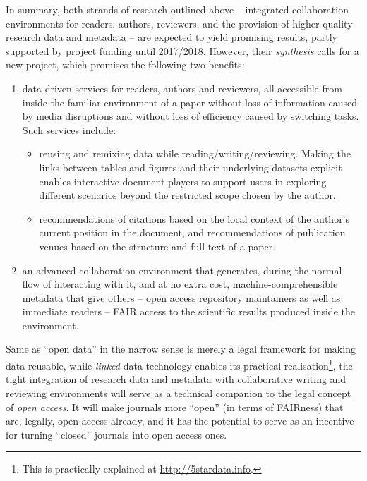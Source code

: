 \documentclass[a4paper,UKenglish]{dagrep}
\begin{document}
In summary, both strands of research outlined above – integrated collaboration
environments for readers, authors, reviewers, and the provision of
higher-quality research data and metadata – are expected to yield promising
results, partly supported by project funding until 2017/2018.
However, their \emph{synthesis} calls for a new project, which promises the
following two benefits:
\begin{enumerate}
\item data-driven services for readers, authors and reviewers, all accessible
from inside the familiar environment of a paper without loss of information
caused by media disruptions and without loss of efficiency caused by switching
tasks.
  Such services include:
  \begin{itemize}
  \item reusing and remixing data while reading/writing/reviewing.
    Making the links between tables and figures and their underlying datasets
explicit enables interactive document players to support users in exploring
different scenarios beyond the restricted scope chosen by the author.
  \item recommendations of citations based on the local context of the author's
current position in the document, and recommendations of publication venues
based on the structure and full text of a paper.
  \end{itemize}
\item an advanced collaboration environment that generates, during the normal
flow of interacting with it, and at no extra cost, machine-comprehensible
metadata that give others
– open access repository maintainers as well as immediate readers – FAIR access
to the scientific results produced inside the environment.
\end{enumerate}

Same as ``open data'' in the narrow sense is merely a legal framework for making
data reusable, while \emph{linked} data technology enables its practical
realisation\footnote{This is practically explained at
\url{http://5stardata.info}.}, the tight integration of research data and
metadata with collaborative writing and reviewing environments will serve as a
technical companion to the legal concept of \emph{open access}.
It will make journals more ``open'' (in terms of FAIRness) that are, legally,
open access already, and it has the potential to serve as an incentive for
turning ``closed'' journals into open access ones.

\end{document}
